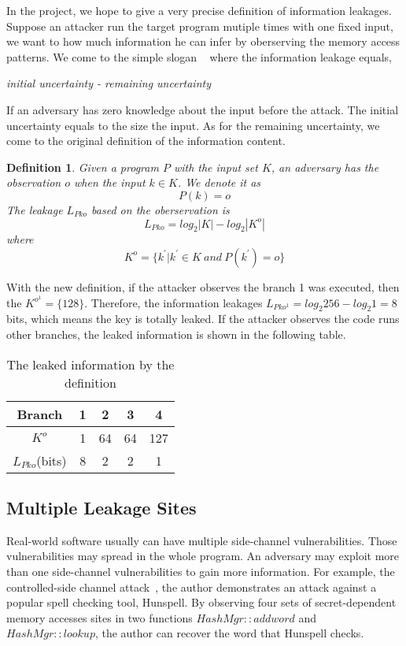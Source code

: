 In the project, we hope to give a very precise definition of information leakages. 
Suppose an attacker run the target program mutiple times with one fixed input, we
want to how much information he can infer by oberserving the memory access patterns.
We come to the simple slogan ~\cite{10.1007/978-3-642-00596-1_21} where the information
leakage equals,

\textit{initial uncertainty - remaining uncertainty}

If an adversary has zero knowledge about the input before the attack. The initial uncertainty
equals to the size the input. As for the remaining uncertainty, we come to the original definition
of the information content.
\newtheorem{mydef}{Definition}

\begin{mydef}
Given a program $P$ with the input set $K$, 
an adversary has the observation $o$ when the input $k{\in}K$. 
We denote it as
    $$P(k) = o$$
The leakage $L_{Pko}$ based on the oberservation is
    $$L_{Pko} = log_2{|K|} - log_2{|K^o|}$$
    where
    $$K^o = \{k^{'} | k^{'}{\in}K \ and \ P(k^{'}) = o \}$$
\end{mydef}

With the new definition, if the attacker observes the branch 1 was executed, then the
$K^{o^{1}} = \{128\}$. Therefore, the information leakages $L_{Pko^{1}} = log_2{256} - log_2{1} = 8$
bits, which means the key is totally leaked. If the attacker observes the code runs other
branches, the leaked information is shown in the following table.

\begin{table}[h]
    \centering
    \begin{tabular}{|c|c|c|c|c|}
    \hline
    Branch & 1 & 2  & 3  & 4   \\ \hline
    $K^o$   & 1 & 64 & 64 & 127 \\ \hline
    $L_{Pko}$(bits)   & 8 & 2  & 2  & 1   \\ \hline
    \end{tabular}
    \caption{The leaked information by the definition}
\end{table}

\subsection{Multiple Leakage Sites}
Real-world software usually can have multiple side-channel vulnerabilities. Those vulnerabilities 
may spread in the whole program. An adversary may exploit more than one side-channel vulnerabilities 
to gain more information. For example, the controlled-side channel attack~\cite{7163052, 191010}, the author 
demonstrates an attack against a popular spell checking tool, Hunspell. By observing four sets 
of secret-dependent memory accesses sites in two functions $HashMgr::addword$ and $HashMgr::lookup$, 
the author can recover the word that Hunspell checks.

